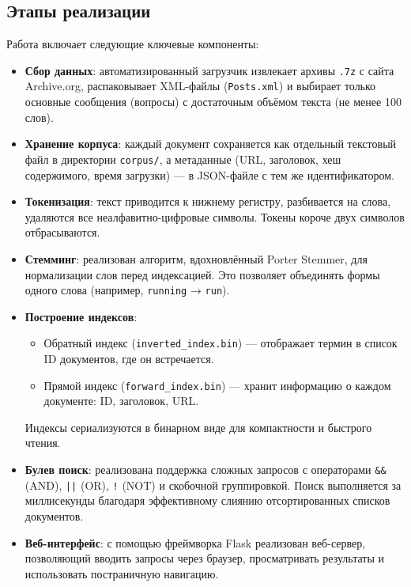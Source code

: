 \subsection*{Этапы реализации}
Работа включает следующие ключевые компоненты:
\begin{itemize}
    \item \textbf{Сбор данных}: автоматизированный загрузчик извлекает архивы \texttt{.7z} с сайта Archive.org, распаковывает XML-файлы (\texttt{Posts.xml}) и выбирает только основные сообщения (вопросы) с достаточным объёмом текста (не менее 100 слов).
    \item \textbf{Хранение корпуса}: каждый документ сохраняется как отдельный текстовый файл в директории \texttt{corpus/}, а метаданные (URL, заголовок, хеш содержимого, время загрузки) — в JSON-файле с тем же идентификатором.
    \item \textbf{Токенизация}: текст приводится к нижнему регистру, разбивается на слова, удаляются все неалфавитно-цифровые символы. Токены короче двух символов отбрасываются.
    \item \textbf{Стемминг}: реализован алгоритм, вдохновлённый Porter Stemmer, для нормализации слов перед индексацией. Это позволяет объединять формы одного слова (например, \texttt{running} → \texttt{run}).
    \item \textbf{Построение индексов}: 
    \begin{itemize}
        \item Обратный индекс (\texttt{inverted\_index.bin}) — отображает термин в список ID документов, где он встречается.
        \item Прямой индекс (\texttt{forward\_index.bin}) — хранит информацию о каждом документе: ID, заголовок, URL.
    \end{itemize}
    Индексы сериализуются в бинарном виде для компактности и быстрого чтения.
    \item \textbf{Булев поиск}: реализована поддержка сложных запросов с операторами \texttt{\&\&} (AND), \texttt{||} (OR), \texttt{!} (NOT) и скобочной группировкой. Поиск выполняется за миллисекунды благодаря эффективному слиянию отсортированных списков документов.
    \item \textbf{Веб-интерфейс}: с помощью фреймворка Flask реализован веб-сервер, позволяющий вводить запросы через браузер, просматривать результаты и использовать постраничную навигацию.
\end{itemize}

